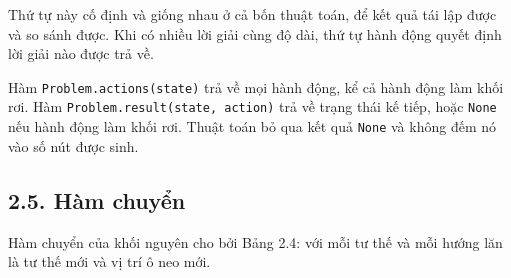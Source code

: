 Thứ tự này cố định và giống nhau ở cả bốn thuật toán, để kết quả tái lập được và so sánh được. Khi có nhiều lời giải cùng độ dài, thứ tự hành động quyết định lời giải nào được trả về.

Hàm \texttt{Problem.\allowbreak{}actions(state)} trả về mọi hành động, kể cả hành động làm khối rơi. Hàm \texttt{Problem.\allowbreak{}result(state, action)} trả về trạng thái kế tiếp, hoặc \texttt{None} nếu hành động làm khối rơi. Thuật toán bỏ qua kết quả \texttt{None} và không đếm nó vào số nút được sinh.

\subsection{2.5. Hàm chuyển}

Hàm chuyển của khối nguyên cho bởi Bảng 2.4: với mỗi tư thế và mỗi hướng lăn là tư thế mới và vị trí ô neo mới.


